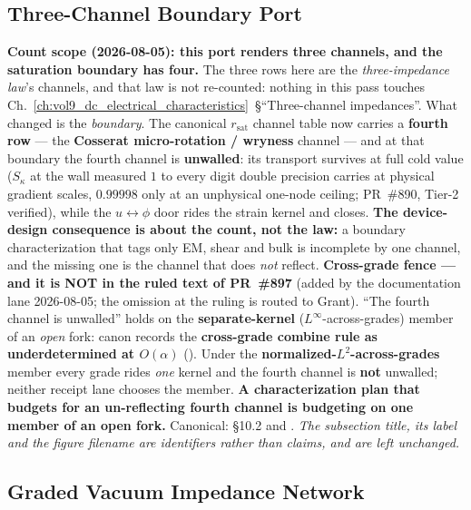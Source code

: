 \subsection{Three-Channel Boundary Port}
\label{sec:vol9_three_channel_circuit}

\noindent\textbf{Count scope (2026-08-05): this port renders three channels, and the saturation boundary has four.} The three rows here are the \emph{three-impedance law}'s channels, and that law is not re-counted: nothing in this pass touches Ch.~\ref{ch:vol9_dc_electrical_characteristics}~\S``Three-channel impedances''. What changed is the \emph{boundary}. The canonical $r_{\mathrm{sat}}$ channel table now carries a \textbf{fourth row} --- the \textbf{Cosserat micro-rotation / wryness} channel --- and at that boundary the fourth channel is \textbf{unwalled}: its transport survives at full cold value ($S_\kappa$ at the wall measured $1$ to every digit double precision carries at physical gradient scales, $0.99998$ only at an unphysical one-node ceiling; PR~\#890, Tier-2 verified), while the $u \leftrightarrow \phi$ door rides the strain kernel and closes. \textbf{The device-design consequence is about the count, not the law:} a boundary characterization that tags only EM, shear and bulk is incomplete by one channel, and the missing one is the channel that does \emph{not} reflect. \textbf{Cross-grade fence --- and it is NOT in the ruled text of PR~\#897} (added by the documentation lane 2026-08-05; the omission at the ruling is routed to Grant). ``The fourth channel is unwalled'' holds on the \textbf{separate-kernel} ($L^\infty$-across-grades) member of an \emph{open} fork: canon records the \textbf{cross-grade combine rule as underdetermined at $O(\alpha)$} (). Under the \textbf{normalized-$L^2$-across-grades} member every grade rides \emph{one} kernel and the fourth channel is \textbf{not} unwalled; neither receipt lane chooses the member. \textbf{A characterization plan that budgets for an un-reflecting fourth channel is budgeting on one member of an open fork.} Canonical:  \S10.2 and . \emph{The subsection title, its label and the figure filename are identifiers rather than claims, and are left unchanged.}



\subsection{Graded Vacuum Impedance Network}
\label{sec:vol9_graded_vacuum_network}

